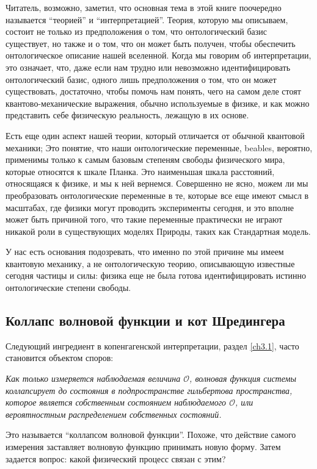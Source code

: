 \documentclass[main.tex]{subfiles}
\begin{document}
Читатель, возможно, заметил, что основная тема в этой книге поочередно называется ``теорией'' и ``интерпретацией''. Теория, которую мы описываем, состоит не только из предположения о том, что онтологический базис существует, но также и о том, что он может быть получен, чтобы обеспечить онтологическое описание нашей вселенной. Когда мы говорим об интерпретации, это означает, что, даже если нам трудно или невозможно идентифицировать онтологический базис, одного лишь предположения о том, что он может существовать, достаточно, чтобы помочь нам понять, чего на самом деле стоят квантово-механические выражения, обычно используемые в физике, и как можно представить себе физическую реальность, лежащую в их основе.

Есть еще один аспект нашей теории, который отличается от обычной квантовой механики; Это понятие, что наши онтологические переменные, beables, вероятно, применимы только к самым базовым степеням свободы физического мира, которые относятся к шкале Планка. Это наименьшая шкала расстояний, относящаяся к физике, и мы к ней вернемся. Совершенно не ясно, можем ли мы преобразовать онтологические переменные в те, которые все еще имеют смысл в масштабах, где физики могут проводить эксперименты сегодня, и это вполне может быть причиной того, что такие переменные практически не играют никакой роли в существующих моделях Природы, таких как Стандартная модель.

У нас есть основания подозревать, что именно по этой причине мы имеем квантовую механику, а не онтологическую теорию, описывающую известные сегодня частицы и силы: физика еще не была готова идентифицировать истинно онтологические степени свободы.

\subsection{Коллапс волновой функции и кот Шредингера}\label{ch3.4}

Следующий ингредиент в копенгагенской интерпретации, раздел \ref{ch3.1}, часто становится объектом споров:

\textit{Как только измеряется наблюдаемая величина $\mathcal O$, волновая функция системы коллапсирует до состояния в подпространстве гильбертова пространства, которое является собственным состоянием наблюдаемого $\mathcal O$, или вероятностным распределением собственных состояний.}

Это называется ``коллапсом волновой функции''. Похоже, что действие самого измерения заставляет волновую функцию принимать новую форму. Затем задается вопрос: какой физический процесс связан с этим?
\end{document}
